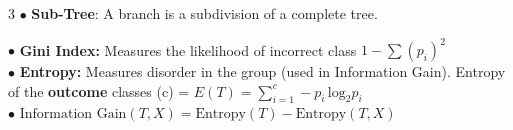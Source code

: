 \documentclass[letterpaper, 10.5pt,landscape]{article}
\begin{document}
\begin{multicols*}{3}
$\bullet$ \textbf{Sub-Tree}: A branch is a subdivision of a complete tree. 



$\bullet$ \textbf{Gini Index:} Measures the likelihood of incorrect class \(\boxed{1 - \sum(p_{i})^{2}} \) \\
$\bullet$ \textbf{Entropy:} Measures disorder in the group (used in Information Gain). Entropy of the \textbf{outcome} classes (c) = \(\boxed{E(T) = \sum^{c}_{i=1} -p_{i} \, \text{log}_{2}p_{i}} \) \\
$\bullet$ \(\text{Information Gain}(T,X) = \text{Entropy}(T) - \text{Entropy}(T, X) \)







\end{multicols*}
\end{document}
